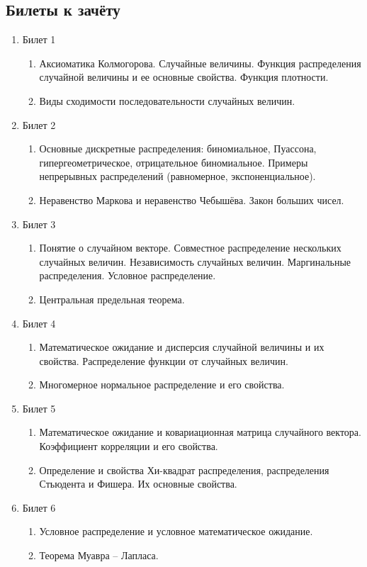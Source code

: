 \documentclass[12pt, a4paper]{article}\usepackage[]{graphicx}\usepackage[]{color}
\begin{document}
\subsection{Билеты к зачёту}


\begin{enumerate}


\item Билет 1
\begin{enumerate}
\item Аксиоматика Колмогорова. Случайные величины. Функция
распределения случайной величины и ее основные свойства. Функция
плотности.
\item Виды сходимости последовательности случайных величин.
\end{enumerate}

\item Билет 2
\begin{enumerate}
\item Основные дискретные распределения: биномиальное, Пуассона,
гипергеометрическое, отрицательное биномиальное. Примеры
непрерывных распределений (равномерное, экспоненциальное).
\item Неравенство Маркова и неравенство Чебышёва. Закон больших чисел.
\end{enumerate}


\item Билет 3
\begin{enumerate}
\item Понятие о случайном векторе. Совместное распределение нескольких
случайных величин. Независимость случайных величин. Маргинальные
распределения. Условное распределение.
\item Центральная предельная теорема.
\end{enumerate}


\item Билет 4
\begin{enumerate}
\item Математическое ожидание и дисперсия случайной величины и их
свойства. Распределение функции от случайных величин.
\item Многомерное нормальное распределение и его свойства.
\end{enumerate}

\item Билет 5
\begin{enumerate}
\item Математическое ожидание и ковариационная матрица случайного
вектора. Коэффициент корреляции и его свойства.
\item Определение и свойства Хи-квадрат распределения, распределения Стьюдента и Фишера. Их основные свойства.
\end{enumerate}

\item Билет 6
\begin{enumerate}
\item Условное распределение и условное математическое ожидание.
\item Теорема Муавра – Лапласа.
\end{enumerate}

\end{enumerate}
\end{document}
